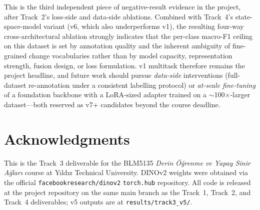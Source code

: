 \documentclass[journal]{IEEEtran}
\begin{document}
This is the third independent piece of negative-result evidence in the project, after Track~2's loss-side and data-side ablations. Combined with Track~4's state-space-model variant (v6, which also underperforms v1), the resulting four-way cross-architectural ablation strongly indicates that the per-class macro-F1 ceiling on this dataset is set by annotation quality and the inherent ambiguity of fine-grained change vocabularies rather than by model capacity, representation strength, fusion design, or loss formulation. v1 multitask therefore remains the project headline, and future work should pursue \emph{data-side} interventions (full-dataset re-annotation under a consistent labelling protocol) or \emph{at-scale fine-tuning} of a foundation backbone with a LoRA-sized adapter trained on a $\sim$100$\times$-larger dataset---both reserved as v7+ candidates beyond the course deadline.

\section*{Acknowledgments}
This is the Track~3 deliverable for the BLM5135 \emph{Derin \"O\u{g}renme ve Yapay Sinir A\u{g}lar\i} course at Y\i ld\i z Technical University. DINOv2 weights were obtained via the official \texttt{facebookresearch/dinov2} \texttt{torch.hub} repository. All code is released at the project repository on the same main branch as the Track~1, Track~2, and Track~4 deliverables; v5 outputs are at \texttt{results/track3\_v5/}.



\end{document}
